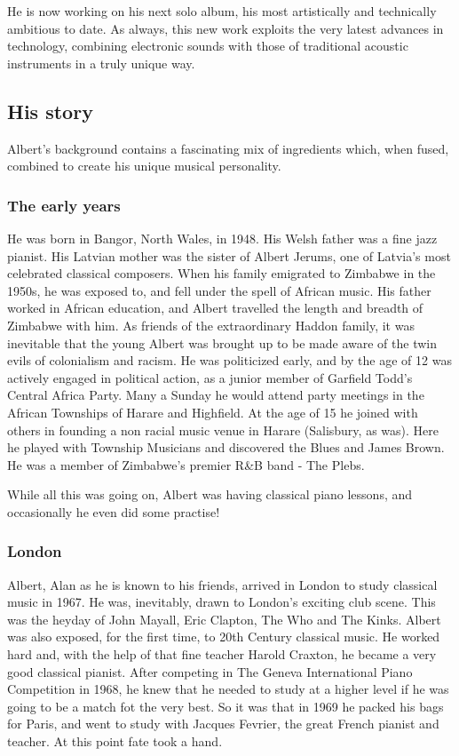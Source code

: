 \documentclass{article}
\begin{document}
He is now working on his next solo album, his most artistically and technically ambitious to date.
As always, this new work exploits the very latest advances in technology, combining electronic sounds with those of traditional acoustic instruments in a truly unique way.

\subsection{His story}

Albert's background contains a fascinating mix of ingredients which, when fused, combined to create his unique musical personality.

\subsubsection{The early years}

He was born in Bangor, North Wales, in 1948.
His Welsh father was a fine jazz pianist.
His Latvian mother was the sister of Albert Jerums, one of Latvia's most celebrated classical composers.
When his family emigrated to Zimbabwe in the 1950s, he was exposed to, and fell under the spell of African music.
His father worked in African education, and Albert travelled the length and breadth of Zimbabwe with him.
As friends of the extraordinary Haddon family, it was inevitable that the young Albert was brought up to be made aware of the twin evils of colonialism and racism.
He was politicized early, and by the age of 12 was actively engaged in political action, as a junior member of Garfield Todd's Central Africa Party.
Many a Sunday he would attend party meetings in the African Townships of Harare and Highfield.
At the age of 15 he joined with others in founding a non racial music venue in Harare (Salisbury, as was).
Here he played with Township Musicians and discovered the Blues and James Brown.
He was a member of Zimbabwe's premier R\&B band - The Plebs.

While all this was going on, Albert was having classical piano lessons, and occasionally he even did some practise!

\subsubsection{London}

Albert, Alan as he is known to his friends, arrived in London to study classical music in 1967.
He was, inevitably, drawn to London's exciting club scene.
This was the heyday of John Mayall, Eric Clapton, The Who and The Kinks.
Albert was also exposed, for the first time, to 20th Century classical music.
He worked hard and, with the help of that fine teacher Harold Craxton, he became a very good classical pianist.
After competing in The Geneva International Piano Competition in 1968, he knew that he needed to study at a higher level if he was going to be a match fot the very best.
So it was that in 1969 he packed his bags for Paris, and went to study with Jacques Fevrier, the great French pianist and teacher.
At this point fate took a hand.
\end{document}
